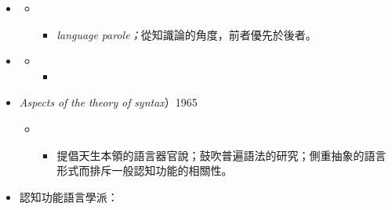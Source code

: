 \begin{itemize}
\item \begin{styleNormalWeb}
\end{styleNormalWeb}

\begin{itemize}
\item \begin{itemize}
\item \begin{styleNormalWeb}
\textit{language} \textit{parole；}從知識論的角度，前者優先於後者。
\end{styleNormalWeb}
\end{itemize}
\end{itemize}
\item \begin{styleNormalWeb}
\end{styleNormalWeb}

\begin{itemize}
\item \begin{itemize}
\item \begin{styleNormalWeb}
\end{styleNormalWeb}
\end{itemize}
\end{itemize}
\item \begin{styleNormalWeb}
\textit{Aspects} \textit{of} \textit{the} \textit{theory} \textit{of} \textit{syntax}）1965
\end{styleNormalWeb}

\begin{itemize}
\item \begin{itemize}
\item \begin{styleNormalWeb}
提倡天生本領的語言器官說；鼓吹普遍語法的研究；側重抽象的語言形式而排斥一般認知功能的相關性。
\end{styleNormalWeb}
\end{itemize}
\end{itemize}
\item \begin{styleNormalWeb}
認知功能語言學派：  
\end{styleNormalWeb}
\end{itemize}

